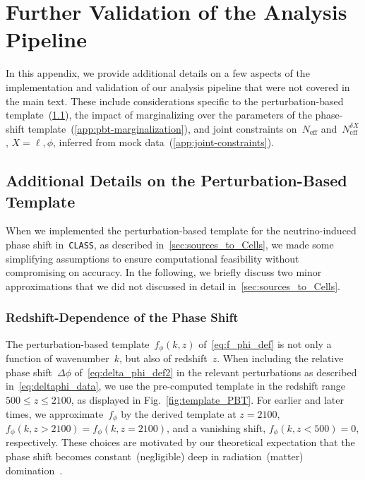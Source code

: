 \documentclass[11pt]{article}
\numberwithin{equation}{section}
\newcommand{\Neff}{N_\mathrm{eff}}
\begin{document}
\clearpage
\appendix
\section{Further Validation of the Analysis Pipeline}
\label{app:validation}

In this appendix, we provide additional details on a few aspects of the implementation and validation of our analysis pipeline that were not covered in the main text. These include considerations specific to the perturbation-based template~(\textsection\ref{app:pbt-details}), the impact of marginalizing over the parameters of the phase-shift template~(\textsection\ref{app:pbt-marginalization}), and joint constraints on~$\Neff$ and~$\Neff^{\delta X}$, $X = \ell, \phi$, inferred from mock data~(\textsection\ref{app:joint-constraints}).


\subsection{Additional Details on the Perturbation-Based Template}
\label{app:pbt-details}

When we implemented the perturbation-based template for the neutrino-induced phase shift in~\texttt{CLASS}, as described in~\textsection\ref{sec:sources_to_Cells}, we made some simplifying assumptions to ensure computational feasibility without compromising on accuracy. In the following, we briefly discuss two minor approximations that we did not discussed in detail in~\textsection\ref{sec:sources_to_Cells}.


\subsubsection*{Redshift-Dependence of the Phase Shift}

The perturbation-based template~$f_\phi(k, z)$ of~\eqref{eq:f_phi_def} is not only a function of wavenumber~$k$, but also of redshift~$z$. When including the relative phase shift~$\Delta\phi$ of~\eqref{eq:delta_phi_def2} in the relevant perturbations as described in~\eqref{eq:deltaphi_data}, we use the pre-computed template in the redshift range $500 \leq z \leq 2100$, as displayed in Fig.~\ref{fig:template_PBT}. For earlier and later times, we approximate~$f_\phi$ by the derived template at $z = 2100$, $f_\phi(k, z > 2100) = f_\phi(k, z = 2100)$, and a vanishing shift, $f_\phi(k, z < 500) = 0$, respectively. These choices are motivated by our theoretical expectation that the phase shift becomes constant~(negligible) deep in radiation~(matter) domination~\cite{Baumann:2015rya}.
\end{document}

